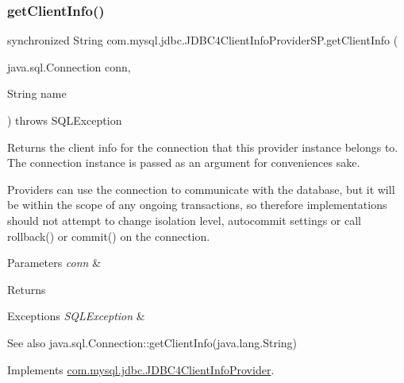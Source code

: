 \subsubsection{\texorpdfstring{get\+Client\+Info()}{getClientInfo()}\hspace{0.1cm}{\footnotesize\ttfamily [2/2]}}
{\footnotesize\ttfamily synchronized String com.\+mysql.\+jdbc.\+J\+D\+B\+C4\+Client\+Info\+Provider\+S\+P.\+get\+Client\+Info (\begin{DoxyParamCaption}\item[{java.\+sql.\+Connection}]{conn,  }\item[{String}]{name }\end{DoxyParamCaption}) throws S\+Q\+L\+Exception}

Returns the client info for the connection that this provider instance belongs to. The connection instance is passed as an argument for convenience\textquotesingle{}s sake.

Providers can use the connection to communicate with the database, but it will be within the scope of any ongoing transactions, so therefore implementations should not attempt to change isolation level, autocommit settings or call rollback() or commit() on the connection.


\begin{DoxyParams}{Parameters}
{\em conn} & \\
\hline
\end{DoxyParams}
\begin{DoxyReturn}{Returns}

\end{DoxyReturn}

\begin{DoxyExceptions}{Exceptions}
{\em S\+Q\+L\+Exception} & \\
\hline
\end{DoxyExceptions}
\begin{DoxySeeAlso}{See also}
java.\+sql.\+Connection\+::get\+Client\+Info(java.\+lang.\+String) 
\end{DoxySeeAlso}


Implements \mbox{\hyperlink{interfacecom_1_1mysql_1_1jdbc_1_1_j_d_b_c4_client_info_provider_ab96958315c2fc129db072cfca9bd9547}{com.\+mysql.\+jdbc.\+J\+D\+B\+C4\+Client\+Info\+Provider}}.

